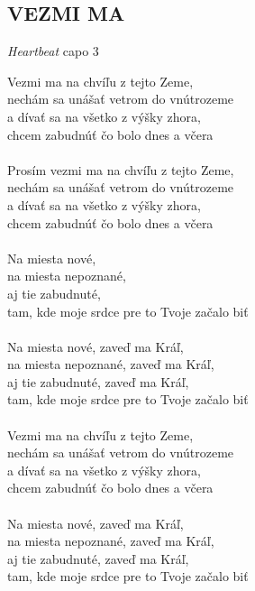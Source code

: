 \documentclass[a4paper, 10pt]{book}
\makeatletter
\newcommand\chord[2][l]{ %
  \makebox[0pt][#1]{\textbf{\begin{tabular}[b]{@{}l@{}}#2\\\mbox{}\end{tabular}}}}
\makeatother
\begin{document}
\begin{LARGE}
\newpage

\begin{flushleft}
	\section*{\Huge VEZMI MA}
	\emph{Heartbeat} \hspace{12cm} capo 3
\end{flushleft}

\chord{E, H, C$\sharp$mi, A}

Vezmi ma na chvíľu z tejto Zeme, \\
nechám sa unášať vetrom do vnútrozeme \\
a dívať sa na všetko z výšky zhora, \\
chcem zabudnúť čo bolo dnes a včera \\
\\
Prosím vezmi ma na chvíľu z tejto Zeme, \\
nechám sa unášať vetrom do vnútrozeme \\
a dívať sa na všetko z výšky zhora, \\
chcem zabudnúť čo bolo dnes a včera \\
\\
Na miesta nové, \\
na miesta nepoznané, \\
aj tie zabudnuté, \\
tam, kde moje srdce pre to Tvoje začalo biť \\
\\
Na miesta nové, zaveď ma Kráľ, \\
na miesta nepoznané, zaveď ma Kráľ, \\
aj tie zabudnuté, zaveď ma Kráľ, \\
tam, kde moje srdce pre to Tvoje začalo biť \\
\\
Vezmi ma na chvíľu z tejto Zeme, \\
nechám sa unášať vetrom do vnútrozeme \\
a dívať sa na všetko z výšky zhora, \\
chcem zabudnúť čo bolo dnes a včera \\
\\
Na miesta nové, zaveď ma Kráľ, \\
na miesta nepoznané, zaveď ma Kráľ, \\
aj tie zabudnuté, zaveď ma Kráľ, \\
tam, kde moje srdce pre to Tvoje začalo biť


\end{LARGE}
\end{document}
